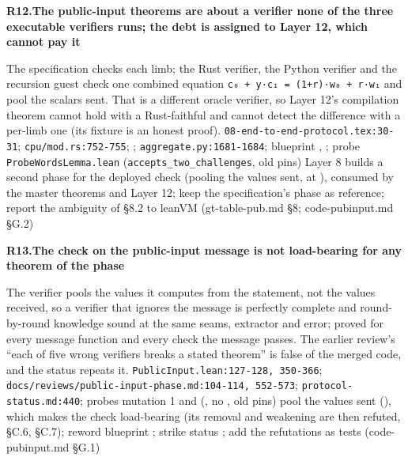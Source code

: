 \par\medskip\noindent\textbf{R12.}\enspace\textbf{The public-input theorems are about a verifier none of the three executable verifiers runs; the debt is assigned to Layer 12, which cannot pay it}\par\nopagebreak
{} The specification checks each limb; the Rust verifier, the Python verifier and the recursion guest check one combined equation \texttt{c₀ + y·c₁ =\allowbreak{} (\allowbreak{}1+r)·w₀ + r·w₁} and pool the scalars sent. That is a different oracle verifier, so Layer 12's compilation theorem cannot hold with a Rust-faithful  and cannot detect the difference with a per-limb one (its fixture is an honest proof).
 \texttt{08-\allowbreak{}end-\allowbreak{}to-\allowbreak{}end-\allowbreak{}protocol.\allowbreak{}tex:\allowbreak{}30-\allowbreak{}31}; \texttt{cpu/\allowbreak{}mod.\allowbreak{}rs:\allowbreak{}752-\allowbreak{}755}; ; \texttt{aggregate.\allowbreak{}py:\allowbreak{}1681-\allowbreak{}1684}; blueprint , ; probe \texttt{Probe\allowbreak{}Words\allowbreak{}Lemma.\allowbreak{}lean} (\texttt{accepts\_\allowbreak{}two\_\allowbreak{}challenges}, old pins)
 Layer 8 builds a second phase for the deployed check (pooling the values sent,  at ), consumed by the master theorems and Layer 12; keep the specification's phase as reference; report the ambiguity of §8.2 to leanVM (gt-table-pub.md §8; code-pubinput.md §G.2)

\par\medskip\noindent\textbf{R13.}\enspace\textbf{The check on the public-input message is not load-bearing for any theorem of the phase}\par\nopagebreak
{} The verifier pools the values it computes from the statement, not the values received, so a verifier that ignores the message is perfectly complete and round-by-round knowledge sound at the same seams, extractor and error; proved for every message function and every check the message passes. The earlier review's ``each of five wrong verifiers breaks a stated theorem'' is false of the merged code, and the status repeats it.
 \texttt{Public\allowbreak{}Input.\allowbreak{}lean:\allowbreak{}127-\allowbreak{}128,\allowbreak{} 350-\allowbreak{}366}; \texttt{docs/\allowbreak{}reviews/\allowbreak{}public-\allowbreak{}input-\allowbreak{}phase.\allowbreak{}md:\allowbreak{}104-\allowbreak{}114,\allowbreak{} 552-\allowbreak{}573}; \texttt{protocol-\allowbreak{}status.\allowbreak{}md:\allowbreak{}440}; probes mutation 1 and  (, no , old pins)
 pool the values sent (), which makes the check load-bearing (its removal and weakening are then refuted, §C.6, §C.7); reword blueprint ; strike status ; add the refutations as tests (code-pubinput.md §G.1)

